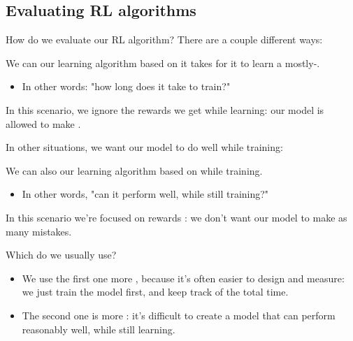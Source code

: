     

    \phantom{}

    \subsection{Evaluating RL algorithms}

        How do we evaluate our RL algorithm? There are a couple different ways:\\

        \begin{concept}
            We can  our learning algorithm based on  it takes for it to learn a mostly-.

            \begin{itemize}
                \item In other words: "how long does it take to train?"
            \end{itemize}

            In this scenario, we ignore the rewards we get while learning: our model is allowed to make .
        \end{concept}

        In other situations, we want our model to do well while training:\\

        \begin{concept}
            We can also  our learning algorithm based on  while training.

            \begin{itemize}
                \item In other words, "can it perform well, while still training?"
            \end{itemize}

            In this scenario we're focused on rewards : we don't want our model to make as many mistakes.
        \end{concept}

        Which do we usually use?

        \begin{itemize}
            \item We use the first one more , because it's often easier to design and measure: we just train the model first, and keep track of the total time.

            \item The second one is more : it's difficult to create a model that can perform reasonably well, while still learning.
                
        \end{itemize}


